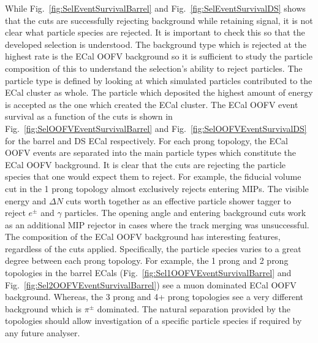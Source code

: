 While Fig.~\ref{fig:SelEventSurvivalBarrel} and Fig.~\ref{fig:SelEventSurvivalDS} shows that the cuts are successfully rejecting background while retaining signal, it is not clear what particle species are rejected.  It is important to check this so that the developed selection is understood.  The background type which is rejected at the highest rate is the ECal OOFV background so it is sufficient to study the particle composition of this to understand the selection's ability to reject particles.  The particle type is defined by looking at which simulated particles contributed to the ECal cluster as whole.  The particle which deposited the highest amount of energy is accepted as the one which created the ECal cluster.  The ECal OOFV event survival as a function of the cuts is shown in Fig.~\ref{fig:SelOOFVEventSurvivalBarrel} and Fig.~\ref{fig:SelOOFVEventSurvivalDS} for the barrel and DS ECal respectively.  For each prong topology, the ECal OOFV events are separated into the main particle types which constitute the ECal OOFV background.  It is clear that the cuts are rejecting the particle species that one would expect them to reject.  For example, the fiducial volume cut in the 1 prong topology almost exclusively rejects entering MIPs.  The visible energy and $\Delta N$ cuts worth together as an effective particle shower tagger to reject $e^\pm$ and $\gamma$ particles.  The opening angle and entering background cuts work as an additional MIP rejector in cases where the track merging was unsuccessful.  The composition of the ECal OOFV background has interesting features, regardless of the cuts applied.  Specifically, the particle species varies to a great degree between each prong topology.  For example, the 1 prong and 2 prong topologies in the barrel ECals (Fig.~\ref{fig:Sel1OOFVEventSurvivalBarrel} and Fig.~\ref{fig:Sel2OOFVEventSurvivalBarrel}) see a muon dominated ECal OOFV background.  Whereas, the 3 prong and 4+ prong topologies see a very different background which is $\pi^\pm$ dominated.  The natural separation provided by the topologies should allow investigation of a specific particle species if required by any future analyser.
